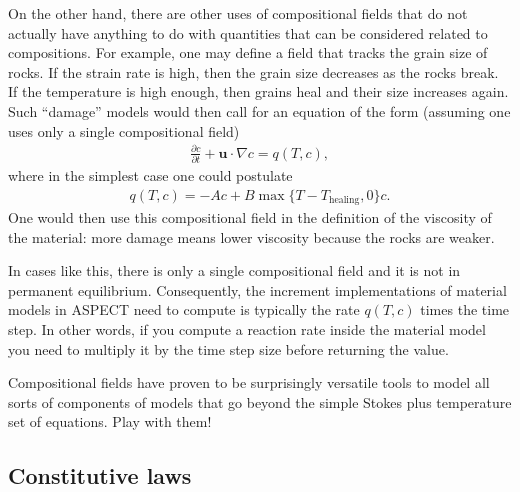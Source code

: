 \documentclass{article}
\newcommand{\aspect}{\textsc{ASPECT}}
\begin{document}
On the other hand, there are other uses of compositional fields that do not
actually have anything to do with quantities that can be considered related to
compositions. For example, one may define a field that tracks the grain size
of rocks. If the strain rate is high, then the grain size decreases as the
rocks break. If the temperature is high enough, then grains heal and their size
increases again. Such ``damage'' models would then call for an equation of the
form (assuming one uses only a single compositional field)
\begin{align*}
  \frac{\partial c}{\partial t} + \mathbf u \cdot \nabla c
  = q(T,c),
\end{align*}
where in the simplest case one could postulate
\begin{align*}
  q(T,c) = -A c + B \max\{T-T_{\text{healing}},0\} c.
\end{align*}
One would then use this compositional field in the definition of the viscosity
of the material: more damage means lower viscosity because the rocks are weaker.

In cases like this, there is only a single compositional field and it is not
in permanent equilibrium. Consequently, the increment implementations of
material models in \aspect{} need to compute is typically the rate $q(T,c)$
times the time step.  In other words, if you compute a reaction rate inside the material model you need to multiply it by the time step size before returning the value.

Compositional fields have proven to be surprisingly versatile tools to model
all sorts of components of models that go beyond the simple Stokes plus
temperature set of equations. Play with them!


\subsection{Constitutive laws}
\end{document}
